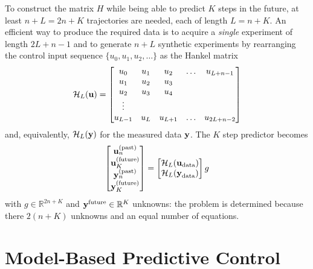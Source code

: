To construct the matrix $H$ while being able to predict $K$ steps in the future, at least $n+L=2n+K$ trajectories are needed, each of length $L=n+K$. An efficient way to produce the required data is to acquire a \emph{single} experiment of length $2L+n-1$ and to generate $n+L$ synthetic experiments by rearranging the control input sequence $\{u_0, u_1, u_2,\ldots\}$ as the Hankel matrix
\begin{equation*}
  \mathcal{H}_L(\boldsymbol{\mathrm{u}}) =
  \begin{bmatrix}
    u_0 & u_1 & u_2 & \ldots & u_{L+n-1} \\
    u_1 & u_2 & u_3  \\
    u_2 & u_3 & u_4 \\
    \vdots \\
    u_{L-1} & u_L & u_{L+1} & \ldots & u_{2L+n-2}
  \end{bmatrix}
\end{equation*}
and, equivalently, $\mathcal{H}_L(\boldsymbol{\mathrm{y}})$ for the measured data $\boldsymbol{\mathrm{y}}$. The $K$ step predictor becomes
\begin{equation*}
  \label{eq:deepc-K-steps-predictor-H}
  \begin{bmatrix}
    \boldsymbol{\mathrm{u}}_n^{(\textrm{past})} \\ \boldsymbol{\mathrm{u}}_K^{(\textrm{future})} \\ \boldsymbol{\mathrm{y}}_n^{(\textrm{past})} \\ \boldsymbol{\mathrm{y}}_K^{(\textrm{future})}
  \end{bmatrix} =
  \begin{bmatrix}
    \mathcal{H}_L(\boldsymbol{\mathrm{u}}_\textrm{data}) \\ \mathcal{H}_L(\boldsymbol{\mathrm{y}}_\textrm{data})
  \end{bmatrix} g
\end{equation*}
with $g\in \mathbb{R}^{2n+K}$ and $\boldsymbol{\mathrm{y}}^\textrm{future}\in\mathbb{R}^K$ unknowns: the problem is determined because there $2(n+K)$ unknowns and an equal number of equations.


\section{Model-Based Predictive Control}
\label{sec:model-based-predictive-control}

